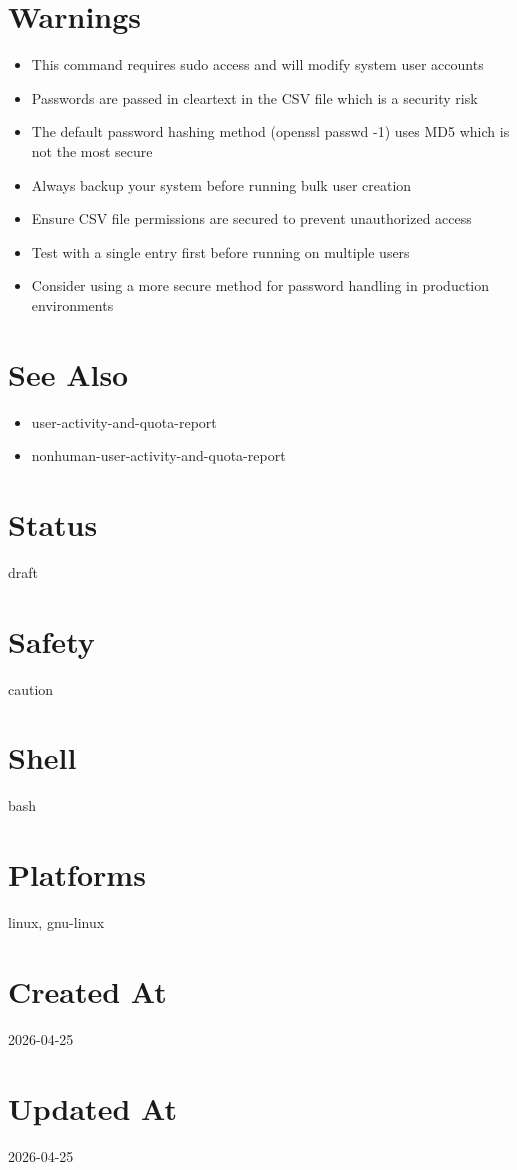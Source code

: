 \documentclass{article}
\begin{document}
\section*{Warnings}
\begin{itemize}
  \item This command requires sudo access and will modify system user accounts
  \item Passwords are passed in cleartext in the CSV file which is a security risk
  \item The default password hashing method (openssl passwd -1) uses MD5 which is not the most secure
  \item Always backup your system before running bulk user creation
  \item Ensure CSV file permissions are secured to prevent unauthorized access
  \item Test with a single entry first before running on multiple users
  \item Consider using a more secure method for password handling in production environments
\end{itemize}

\section*{See Also}
\begin{itemize}
  \item user-activity-and-quota-report
  \item nonhuman-user-activity-and-quota-report
\end{itemize}

\section*{Status}
draft

\section*{Safety}
caution

\section*{Shell}
bash

\section*{Platforms}
linux, gnu-linux

\section*{Created At}
2026-04-25

\section*{Updated At}
2026-04-25
\end{document}
